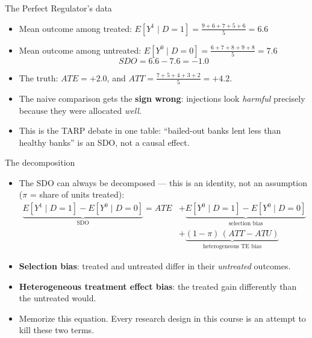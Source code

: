\documentclass[
  11pt,
  ignorenonframetext,
  aspectratio=169,
]{beamer}
\providecommand{\tightlist}{%
  \setlength{\itemsep}{0pt}\setlength{\parskip}{0pt}}
\begin{document}
\begin{frame}{The Perfect Regulator's data}
\protect{}\label{the-perfect-regulators-data}
\begin{itemize}
\tightlist
\item
  Mean outcome among treated:
  \(E[Y^1 \mid D=1] = \frac{9+6+7+5+6}{5} = 6.6\)
\item
  Mean outcome among untreated:
  \(E[Y^0 \mid D=0] = \frac{6+7+8+9+8}{5} = 7.6\) \[
  SDO = 6.6 - 7.6 = -1.0
  \]
\item
  The truth: \(ATE = +2.0\), and \(ATT = \frac{7+5+4+3+2}{5} = +4.2\).
\item
  The naive comparison gets the \textbf{sign wrong}: injections look
  \emph{harmful} precisely because they were allocated \emph{well}.
\item
  This is the TARP debate in one table: ``bailed-out banks lent less
  than healthy banks'' is an SDO, not a causal effect.
\end{itemize}
\end{frame}

\begin{frame}{The decomposition}
\protect{}\label{the-decomposition}
\begin{itemize}
\item
  The SDO can always be decomposed --- this is an identity, not an
  assumption (\(\pi\) = share of units treated): \[
  \begin{aligned}
  \underbrace{E[Y^1 \mid D{=}1] - E[Y^0 \mid D{=}0]}_{\text{SDO}}
  = ATE &+ \underbrace{E[Y^0 \mid D{=}1] - E[Y^0 \mid D{=}0]}_{\text{selection bias}} \\
  &+ \underbrace{(1-\pi)\,(ATT - ATU)}_{\text{heterogeneous TE bias}}
  \end{aligned}
  \]
\item
  \textbf{Selection bias}: treated and untreated differ in their
  \emph{untreated} outcomes.
\item
  \textbf{Heterogeneous treatment effect bias}: the treated gain
  differently than the untreated would.
\item
  Memorize this equation. Every research design in this course is an
  attempt to kill these two terms.
\end{itemize}
\end{frame}
\end{document}
